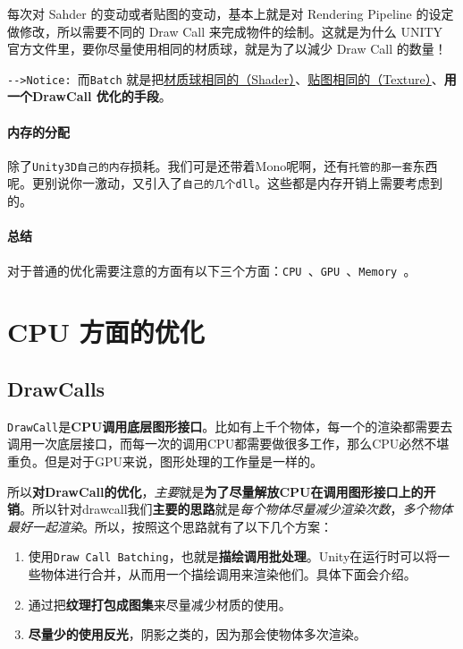 \documentclass[UTF8,a4paper,12pt]{ctexart}
\begin{document}
	  			每次对 Sahder 的变动或者贴图的变动，基本上就是对 Rendering Pipeline 的设定做修改，所以需要不同的 Draw Call 来完成物件的绘制。这就是为什么 UNITY 官方文件里，要你尽量使用相同的材质球，就是为了以減少 Draw Call 的数量！
	  			
	  			
	  			\verb|-->Notice: |而\verb|Batch| 就是把\underline{材质球相同的（Shader）}、\underline{贴图相同的（Texture）}、\textbf{用一个DrawCall 优化的手段}。
	  			
	  	\paragraph{内存的分配}
	 		除了\verb|Unity3D自己的内存|损耗。我们可是还带着Mono呢啊，还有\verb|托管的那一套|东西呢。更别说你一激动，又引入了\verb|自己的几个dll|。这些都是内存开销上需要考虑到的。
	 
	 
	 	\paragraph{总结}
	 		对于普通的优化需要注意的方面有以下三个方面：\verb|CPU |、\verb|GPU |、\verb|Memory |。
 		
  \section{CPU 方面的优化}
	  	\subsection{DrawCalls}
	  		\verb|DrawCall|是\textbf{CPU调用底层图形接口}。比如有上千个物体，每一个的渲染都需要去调用一次底层接口，而每一次的调用CPU都需要做很多工作，那么CPU必然不堪重负。但是对于GPU来说，图形处理的工作量是一样的。
	  		
	  		所以\textbf{对DrawCall的优化}，\textit{主要}就是\textbf{为了尽量解放CPU在调用图形接口上的开销}。所以针对drawcall我们\textbf{主要的思路}就是\textit{每个物体尽量减少渲染次数}，\textit{多个物体最好一起渲染}。所以，按照这个思路就有了以下几个方案：
	  			\begin{enumerate}
	  				\item 使用\verb|Draw Call Batching|，也就是\textbf{描绘调用批处理}。Unity在运行时可以将一些物体进行合并，从而用一个描绘调用来渲染他们。具体下面会介绍。
	  				\item 通过把\textbf{纹理打包成图集}来尽量减少材质的使用。
	  				\item \textbf{尽量少的使用反光}，阴影之类的，因为那会使物体多次渲染。
	  			\end{enumerate}
\end{document}
